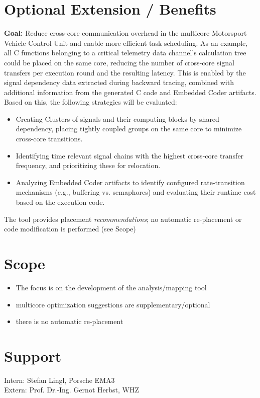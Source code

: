 \documentclass[a4paper,12pt]{report}
\begin{document}

\section{Optional Extension / Benefits}

\textbf{Goal:} Reduce cross-core communication overhead in the multicore
Motorsport Vehicle Control Unit and enable more efficient task scheduling.
As an example, all C functions belonging to a critical telemetry data
channel's calculation tree could be placed on the same core, reducing the
number of cross-core signal transfers per execution round and the resulting
latency. This is enabled by the signal dependency data extracted during
backward tracing, combined with additional information from the generated
C code and Embedded Coder artifacts.\\
\newline
\noindent
Based on this, the following strategies will be evaluated:

\begin{itemize}
  \setlength{\itemsep}{0.05em}
  \item Creating Clusters of signals and their computing blocks by shared dependency,
        placing tightly coupled groups on the same core to minimize
        cross-core transitions.
  \item Identifying time relevant signal chains with the highest cross-core transfer
        frequency, and prioritizing these for relocation.
  \item Analyzing Embedded Coder artifacts to identify configured rate-transition mechanisms 
        (e.g., buffering vs. semaphores) and evaluating their runtime cost based on the execution code.
\end{itemize}
\noindent
The tool provides placement \emph{recommendations}; no automatic
re-placement or code modification is performed (see Scope)



\section{Scope}

\begin{itemize}
  \setlength{\itemsep}{0.05em}
  \item The focus is on the development of the analysis/mapping tool
  \item multicore optimization suggestions are supplementary/optional
  \item there is no automatic re-placement
\end{itemize}



\section{Support}

Intern: Stefan Lingl, Porsche EMA3 \\
Extern: Prof. Dr.-Ing. Gernot Herbst, WHZ
\end{document}
